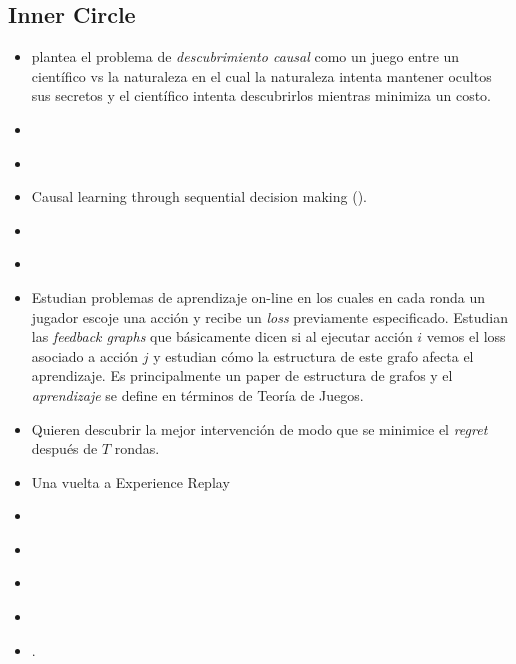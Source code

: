 \documentclass[11pt]{article}
\theoremstyle{plain}
\begin{document}
\subsection{Inner Circle}
\begin{itemize}
\item \cite{eberhardt2008causal} plantea el problema de \textit{descubrimiento causal} como un juego entre un científico vs la naturaleza en el cual la naturaleza intenta mantener ocultos sus secretos y el científico intenta descubrirlos mientras minimiza un costo. 
\item \cite{eberhardt2012number}
\item \cite{hauser2012two}
\item Causal learning through sequential decision making (\cite{hagmayer2013repeated}).
\item \cite{ortega2014generalized} 
\item \cite{bramley2015staying}
\item \cite{alon2015online} Estudian problemas de aprendizaje on-line en los cuales en cada ronda un jugador escoje una acción y recibe un \textit{loss} previamente especificado. Estudian las \textit{feedback graphs} que básicamente dicen si al ejecutar acción $i$ vemos el loss asociado a acción $j$ y estudian cómo la estructura de este grafo afecta el aprendizaje. Es principalmente un paper de estructura de grafos y el \textit{aprendizaje} se define en términos de Teoría de Juegos.
\item \cite{lattimoreNIPS2016} Quieren descubrir la mejor intervención de modo que se minimice el \textit{regret} después de $T$ rondas.
\item \cite{zhang2017deeper} Una vuelta a Experience Replay
\item \cite{albrecht2017autonomous}
\item \cite{albrecht2016exploiting}
\item \cite{garnelo2016towards}
\item \cite{pearl2018theoretical}
\item \cite{innes2018reasoning}. 
\end{itemize}
\end{document}
